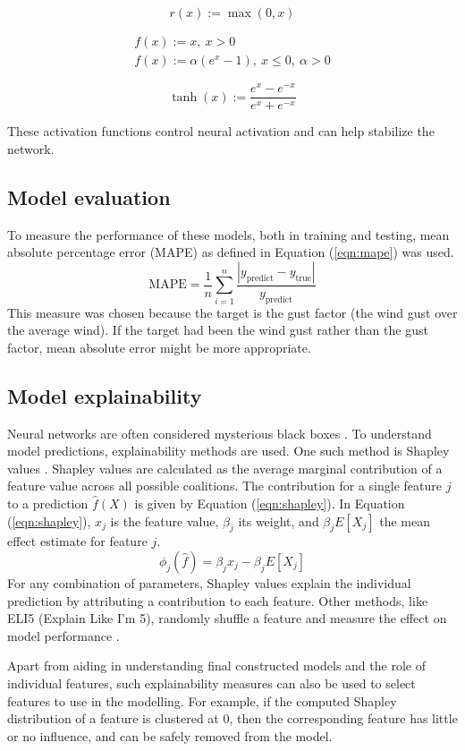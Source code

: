 \begin{equation}
    \label{eqn:relu}
    r(x):=\max(0, x)
\end{equation}

\begin{align}
    \label{eqn:elu}
    f(x) := x,\ x > 0\\
    f(x) := \alpha (e^x-1),\ x\leq 0,\ \alpha > 0
\end{align}

\begin{equation}
    \label{eqn:tanh}
    \operatorname{tanh}(x):=\frac{e^x-e^{-x}}{e^x+e^{-x}}
\end{equation}

These activation functions control neural activation and can help stabilize the network.
\subsection{Model evaluation}
To measure the performance of these models, both in training and testing, mean absolute percentage error (MAPE) as defined in Equation (\ref{eqn:mape}) was used.
\begin{equation}
    \label{eqn:mape}
    \text{MAPE} = \frac{1}{n}\sum_{i=1}^n\frac{|y_{\mathrm{predict}} - y_{\mathrm{true}}|}{y_{\mathrm{predict}}}
\end{equation}
This measure was chosen because the target is the gust factor (the wind gust over the average wind). If the target had been the wind gust rather than the gust factor, mean absolute error might be more appropriate.

\subsection{Model explainability}
Neural networks are often considered mysterious black boxes \cite{nn_black_box}. To understand model predictions, explainability methods are used. One such method is Shapley values \cite{shapley_information}. Shapley values are calculated as the average marginal contribution of a feature value across all possible coalitions. The contribution for a single feature \(j\) to a prediction \(\hat{f}(X)\) is given by Equation (\ref{eqn:shapley}). In Equation (\ref{eqn:shapley}), \(x_j\) is the feature value, \(\beta_j\) its weight, and \(\beta_j E[X_j]\) the mean effect estimate for feature \(j\).
\begin{equation}
    \label{eqn:shapley}
    \phi_j(\hat{f}) = \beta_j x_j - \beta_j E[X_j]
\end{equation}
For any combination of parameters, Shapley values explain the individual prediction by attributing a contribution to each feature. Other methods, like ELI5 (Explain Like I’m 5), randomly shuffle a feature and measure the effect on model performance \cite{eli5_information}.

Apart from aiding in understanding final constructed models and the role of individual features, such explainability measures can also be used to select features to use in the modelling. For example, if the computed Shapley distribution of a feature is clustered at 0, then the corresponding feature has little or no influence, and can be safely removed from the model.
